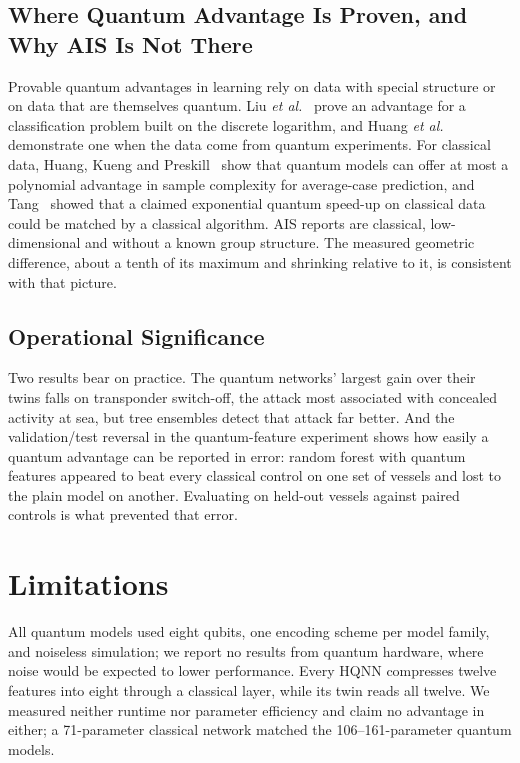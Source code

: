 \documentclass[journal]{IEEEtran}
\begin{document}
\subsection{Where Quantum Advantage Is Proven, and Why AIS Is Not There}
Provable quantum advantages in learning rely on data with special structure or
on data that are themselves quantum. Liu \textit{et al.}~\cite{liu2021rigorous}
prove an advantage for a classification problem built on the discrete
logarithm, and Huang \textit{et al.}~\cite{huang2022experiments} demonstrate one
when the data come from quantum experiments. For classical data, Huang, Kueng
and Preskill~\cite{huang2021information} show that quantum models can offer at
most a polynomial advantage in sample complexity for average-case prediction,
and Tang~\cite{tang2019quantum} showed that a claimed exponential quantum
speed-up on classical data could be matched by a classical algorithm. AIS
reports are classical, low-dimensional and without a known group structure. The
measured geometric difference, about a tenth of its maximum and shrinking
relative to it, is consistent with that picture.

\subsection{Operational Significance}
Two results bear on practice. The quantum networks' largest gain over their
twins falls on transponder switch-off, the attack most associated with concealed
activity at sea, but tree ensembles detect that attack far better. And the
validation/test reversal in the quantum-feature experiment shows how easily a
quantum advantage can be reported in error: random forest with quantum features
appeared to beat every classical control on one set of vessels and lost to the
plain model on another. Evaluating on held-out vessels against paired controls
is what prevented that error.

\section{Limitations}
\label{sec:limitations}
All quantum models used eight qubits, one encoding scheme per model family, and
noiseless simulation; we report no results from quantum hardware, where noise
would be expected to lower performance. Every HQNN compresses twelve features
into eight through a classical layer, while its twin reads all twelve. We
measured neither runtime nor parameter efficiency and claim no advantage in
either; a 71-parameter classical network matched the 106--161-parameter quantum
models.
\end{document}
